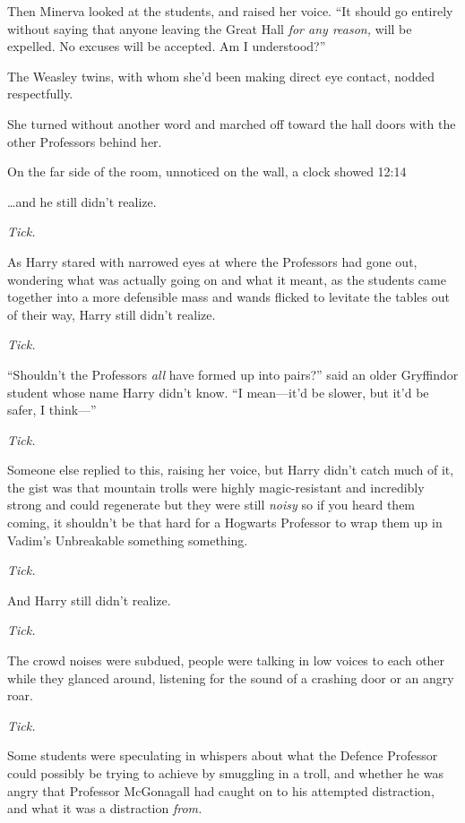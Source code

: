 Then Minerva looked at the students, and raised her voice. “It should go entirely without saying that anyone leaving the Great Hall \emph{for any reason,} will be expelled. No excuses will be accepted. Am I understood?”

The Weasley twins, with whom she’d been making direct eye contact, nodded respectfully.

She turned without another word and marched off toward the hall doors with the other Professors behind her.

On the far side of the room, unnoticed on the wall, a clock showed 12:14\pm

\later

…and he still didn’t realize.

\emph{Tick.}

As Harry stared with narrowed eyes at where the Professors had gone out, wondering what was actually going on and what it meant, as the students came together into a more defensible mass and wands flicked to levitate the tables out of their way, Harry still didn’t realize.

\emph{Tick.}

“Shouldn’t the Professors \emph{all} have formed up into pairs?” said an older Gryffindor student whose name Harry didn’t know. “I mean—it’d be slower, but it’d be safer, I think—”

\emph{Tick.}

Someone else replied to this, raising her voice, but Harry didn’t catch much of it, the gist was that mountain trolls were highly magic-resistant and incredibly strong and could regenerate but they were still \emph{noisy} so if you heard them coming, it shouldn’t be that hard for a Hogwarts Professor to wrap them up in Vadim’s Unbreakable something something.

\emph{Tick.}

And Harry still didn’t realize.

\emph{Tick.}

The crowd noises were subdued, people were talking in low voices to each other while they glanced around, listening for the sound of a crashing door or an angry roar.

\emph{Tick.}

Some students were speculating in whispers about what the Defence Professor could possibly be trying to achieve by smuggling in a troll, and whether he was angry that Professor McGonagall had caught on to his attempted distraction, and what it was a distraction \emph{from.}


